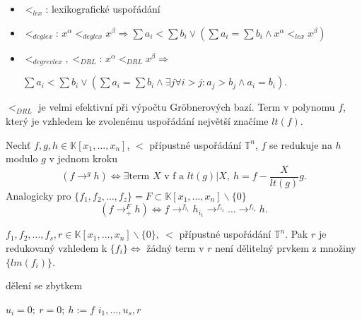 \begin{example}
    \begin{itemize}
        \item $<_{lex}$: lexikografické uspořádání
        \item $<_{deglex}$: $x^\alpha<_{deglex}x^\beta\Rightarrow\sum a_i < \sum b_i \lor (\sum a_i = \sum b_i \land x^\alpha <_{lex} x^\beta)$
        \item $<_{degrevlex},<_{DRL}$: $x^\alpha<_{DRL}x^\beta\Rightarrow$
        
        $\sum a_i < \sum b_i \lor (\sum a_i = \sum b_i \land \exists j \forall i>j:a_j>b_j \land a_i=b_i).$
    \end{itemize}
    $<_{DRL}$ je velmi efektivní při výpočtu Gröbnerových bazí. Term v polynomu $f$, který je vzhledem ke zvolenému uspořádání největší značíme $lt(f)$.
\end{example}

\begin{defn}
    Nechť $f,g,h \in \mathbb{K}[x_1,\dots,x_n]$, $<$ přípustné uspořádání $\mathbb{T}^n$, $f$ se redukuje na $h$ modulo $g$ v jednom kroku
    \[
        (f \rightarrow^g h) \Leftrightarrow \exists\text{term $X$ v f a }lt(g)|X,\ h=f-\frac{X}{lt(g)}g.
    \]
    Analogicky pro $\{f_1,f_2,\dots,f_z\}=F \subset \mathbb{K}[x_1,\dots,x_n]\backslash\{0\}$
    \[
        (f \rightarrow^F_+ h) \Leftrightarrow f \rightarrow^{f_{i_1}} h_{i_1} \rightarrow^{f_{i_2}} \dots \rightarrow^{f_{i_s}} h.
    \]
\end{defn}

\begin{defn}
    $f_1,f_2,\dots,f_s,r \in \mathbb{K}[x_1,\dots,x_n]\backslash\{0\},\ <$ přípustné uspořádání $\mathbb{T}^n$. Pak $r$ je redukovaný vzhledem k $\{f_i\} \Leftrightarrow$ žádný term v $r$ není dělitelný prvkem z množiny $\{lm(f_i)\}$.
\end{defn}

\begin{algorithm}\label{algo:div}
    \caption{dělení se zbytkem}
    $u_i=0;\ r=0;\ h:=f$\;
    \Return $i_1,\dots,u_s,r$
    \vspace{0.2cm}
\end{algorithm}

